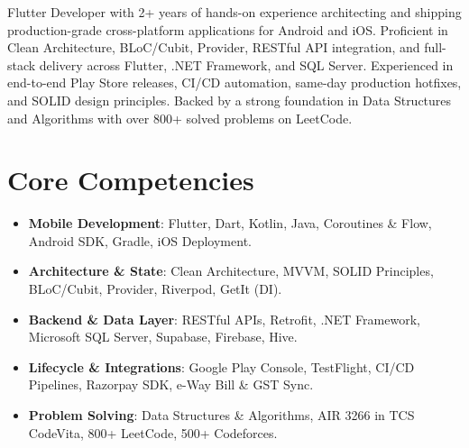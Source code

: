 \documentclass[11pt,a4paper,sans]{moderncv}
\begin{document}
\makecvtitle


\vspace{-10pt}
\small{Flutter Developer with 2+ years of hands-on experience architecting and shipping production-grade cross-platform applications for Android and iOS. Proficient in Clean Architecture, BLoC/Cubit, Provider, RESTful API integration, and full-stack delivery across Flutter, .NET Framework, and SQL Server. Experienced in end-to-end Play Store releases, CI/CD automation, same-day production hotfixes, and SOLID design principles. Backed by a strong foundation in Data Structures and Algorithms with over 800+ solved problems on LeetCode.}


\section{Core Competencies}
\vspace{1pt}
\begin{itemize}
\item \textbf{Mobile Development}: Flutter, Dart, Kotlin, Java, Coroutines \& Flow, Android SDK, Gradle, iOS Deployment.
\item \textbf{Architecture \& State}: Clean Architecture, MVVM, SOLID Principles, BLoC/Cubit, Provider, Riverpod, GetIt (DI).
\item \textbf{Backend \& Data Layer}: RESTful APIs, Retrofit, .NET Framework, Microsoft SQL Server, Supabase, Firebase, Hive.
\item \textbf{Lifecycle \& Integrations}: Google Play Console, TestFlight, CI/CD Pipelines, Razorpay SDK, e-Way Bill \& GST Sync.
\item \textbf{Problem Solving}: Data Structures \& Algorithms, AIR 3266 in TCS CodeVita, 800+ LeetCode, 500+ Codeforces.
\end{itemize}

\end{document}
